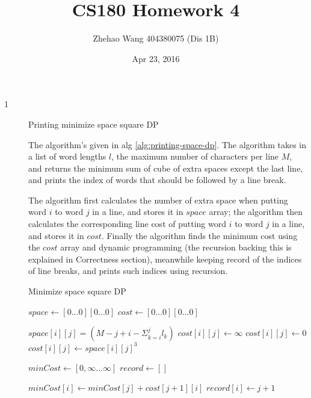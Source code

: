 \documentclass{article}
\title{CS180 Homework 4}
\author{Zhehao Wang 404380075 (Dis 1B)}
\date{Apr 23, 2016}
\begin{document}
\maketitle

\begin{description}

\item[1]{Printing minimize space square DP}

  The algorithm's given in alg \ref{alg:printing-space-dp}. The algorithm takes in a list of word lengths $l$, the maximum number of characters per line $M$, and returns the minimum sum of cube of extra spaces except the last line, and prints the index of words that should be followed by a line break.

  The algorithm first calculates the number of extra space when putting word $i$ to word $j$ in a line, and stores it in $space$ array; the algorithm then calculates the corresponding line cost of putting word $i$ to word $j$ in a line, and stores it in $cost$. Finally the algorithm finds the minimum cost using the $cost$ array and dynamic programming (the recursion backing this is explained in Correctness section), meanwhile keeping record of the indices of line breaks, and prints such indices using recursion. 

  \begin{algorithm}[H]
  \caption{Minimize space square DP}
  \label{alg:printing-space-dp}
    \begin{algorithmic}[1]


      \State $space \gets [0...0][0...0]$
      \State $cost \gets [0...0][0...0]$

          \State $space[i][j] = (M - j + i - \Sigma_{k=i}^{j}{l_k})$
            \State $cost[i][j] \gets \infty$
            \State $cost[i][j] \gets 0$
          \Else
            \State $cost[i][j] \gets space[i][j]^3$
          \EndIf
        \EndFor
      \EndFor

      $minCost \gets [0, \infty...\infty]$
      $record \gets []$

            \State $minCost[i] \gets minCost[j] + cost[j+1][i]$
            \State $record[i] \gets j+1$
          \EndIf
        \EndFor
      \EndFor


\end{algorithmic}
\end{algorithm}
\end{description}
\end{document}

